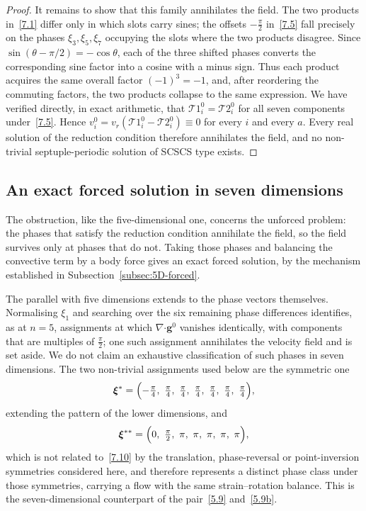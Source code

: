 \documentclass[11pt]{jfm}
\providecommand\bcdot{\boldsymbol{\cdot}}
\numberwithin{equation}{section}
\begin{document}
\begin{proof}
It remains to show that this family annihilates the field. The two products in~\eqref{7.1} differ
only in which slots carry sines; the offsets $-\tfrac{\pi}{2}$ in~\eqref{7.5} fall precisely on
the phases $\xi_3,\xi_5,\xi_7$ occupying the slots where the two products disagree. Since
$\sin(\theta-\pi/2)=-\cos\theta$, each of the three shifted phases converts the corresponding sine
factor into a cosine with a minus sign. Thus each product acquires the same overall factor
$(-1)^3=-1$, and, after reordering the commuting factors, the two products collapse to the same
expression. We have verified directly, in exact arithmetic, that
$\mathcal{T}1_i^0=\mathcal{T}2_i^0$ for all seven components under~\eqref{7.5}. Hence
$v_i^0=v_r(\mathcal{T}1_i^0-\mathcal{T}2_i^0)\equiv 0$ for every $i$ and every $a$. Every real
solution of the reduction condition therefore annihilates the field, and no non-trivial
septuple-periodic solution of SCSCS type exists.
\end{proof}

\subsection{An exact forced solution in seven dimensions}
\label{subsec:7D-forced}
The obstruction, like the five-dimensional one, concerns the unforced problem: the phases that
satisfy the reduction condition annihilate the field, so the field survives only at phases that do
not. Taking those phases and balancing the convective term by a body force gives an exact forced
solution, by the mechanism established in Subsection~\ref{subsec:5D-forced}.

The parallel with five dimensions extends to the phase vectors themselves. Normalising $\xi_1$ and
searching over the six remaining phase differences identifies, as at $n=5$, assignments at which
$\nabla\bcdot\boldsymbol{g}^0$ vanishes identically, with components that are multiples of
$\tfrac{\pi}{2}$; one such assignment annihilates the velocity field and is set aside. We do not
claim an exhaustive classification of such phases in seven dimensions. The two non-trivial
assignments used below are the symmetric one
\begin{equation}
\label{7.10}
\boldsymbol{\xi}^{\ast}
=\Bigl(-\tfrac{\pi}{4},\ \tfrac{\pi}{4},\ \tfrac{\pi}{4},\ \tfrac{\pi}{4},\ \tfrac{\pi}{4},\
\tfrac{\pi}{4},\ \tfrac{\pi}{4}\Bigr),
\end{equation}
extending the pattern of the lower dimensions, and
\begin{equation}
\label{7.10b}
\boldsymbol{\xi}^{\ast\ast}
=\Bigl(0,\ \tfrac{\pi}{2},\ \pi,\ \pi,\ \pi,\ \pi,\ \pi\Bigr),
\end{equation}
which is not related to~\eqref{7.10} by the translation, phase-reversal or point-inversion
symmetries considered here, and therefore represents a distinct phase class under those symmetries,
carrying a flow with the same strain--rotation balance. This is the
seven-dimensional counterpart of the pair~\eqref{5.9} and~\eqref{5.9b}.
\end{document}
